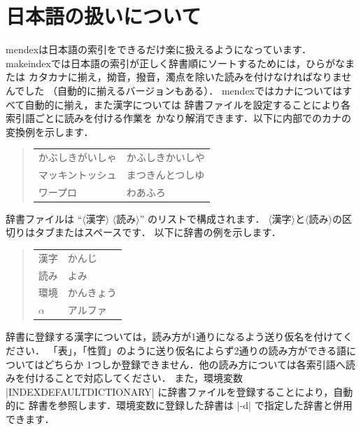 \documentclass[a4paper,dvipdfmx]{jsarticle}
\newcommand{\SoftName}[1]{\textsf{#1}}
\newcommand{\jMeta}[1]{$\langle$\mbox{}\textsf{#1}\mbox{}$\rangle$}
\begin{document}
%

\section{日本語の扱いについて}

\SoftName{mendex}は日本語の索引をできるだけ楽に扱えるようになっています．
\SoftName{makeindex}では日本語の索引が正しく辞書順にソートするためには，ひらがなまたは
カタカナに揃え，拗音，撥音，濁点を除いた読みを付けなければなりませんでした
（自動的に揃えるバージョンもある）．
\SoftName{mendex}ではカナについてはすべて自動的に揃え，また漢字については
辞書ファイルを設定することにより各索引語ごとに読みを付ける作業を
かなり解消できます．以下に内部でのカナの変換例を示します．
%
\begin{quote}
\begin{tabular}{ll}
かぶしきがいしゃ & かふしきかいしや \\
マッキントッシュ & まつきんとつしゆ \\
ワープロ & わあふろ
\end{tabular}
\end{quote}

辞書ファイルは ``\jMeta{漢字} \jMeta{読み}'' のリストで構成されます．
\jMeta{漢字}と\jMeta{読み}の区切りはタブまたはスペースです．
以下に辞書の例を示します．
%
\begin{quote}
\begin{tabular}{ll}
漢字 & かんじ \\
読み & よみ \\
環境 & かんきょう \\
$\alpha$ & アルファ
\end{tabular}
\end{quote}

辞書に登録する漢字については，読み方が1通りになるよう送り仮名を付けてください．
「表」，「性質」のように送り仮名によらず2通りの読み方ができる語についてはどちらか
1つしか登録できません．他の読み方については各索引語へ読みを付けることで対応してください．
また，環境変数 |INDEXDEFAULTDICTIONARY| に辞書ファイルを登録することにより，自動的に
辞書を参照します．環境変数に登録した辞書は |-d| で指定した辞書と併用できます．
\end{document}
